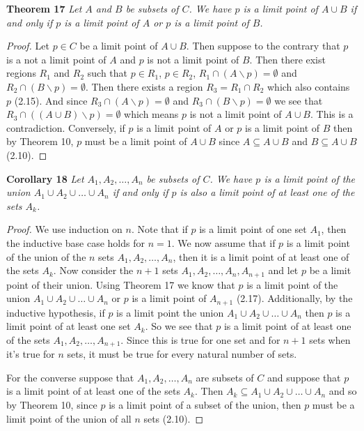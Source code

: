 \documentclass{article}
\begin{document}
\begin{flushleft}
\textbf{Theorem 17}
\textsl{Let $A$ and $B$ be subsets of $C$. We have $p$ is a limit point of $A \cup B$ if and only if $p$ is a limit point of $A$ or $p$ is a limit point of $B$.}
\begin{proof}
Let $p \in C$ be a limit point of $A \cup B$. Then suppose to the contrary that $p$ is a not a limit point of $A$ and $p$ is not a limit point of $B$. Then there exist regions $R_1$ and $R_2$ such that $p \in R_1$, $p \in R_2$, $R_1 \cap (A \backslash p) = \emptyset$ and $R_2 \cap (B \backslash p) = \emptyset$. Then there exists a region $R_3 = R_1 \cap R_2$ which also contains $p$ (2.15). And since $R_3 \cap (A \backslash p) = \emptyset$ and $R_3 \cap (B \backslash p) = \emptyset$ we see that $R_3 \cap ((A \cup B) \backslash p) = \emptyset$ which means $p$ is not a limit point of $A \cup B$. This is a contradiction. Conversely, if $p$ is a limit point of $A$ or $p$ is a limit point of $B$ then by Theorem 10, $p$ must be a limit point of $A \cup B$ since $A \subseteq A \cup B$ and $B \subseteq A \cup B$ (2.10).
\end{proof}

\textbf{Corollary 18}
\textsl{Let $A_1,A_2, \dots ,A_n$ be subsets of $C$. We have $p$ is a limit point of the union $A_1 \cup A_2 \cup \dots \cup A_n$ if and only if $p$ is also a limit point of at least one of the sets $A_k$.}
\begin{proof}
We use induction on $n$. Note that if $p$ is a limit point of one set $A_1$, then the inductive base case holds for $n=1$. We now assume that if $p$ is a limit point of the union of the $n$ sets $A_1,A_2, \dots ,A_n$, then it is a limit point of at least one of the sets $A_k$. Now consider the $n+1$ sets $A_1,A_2, \dots ,A_n, A_{n+1}$ and let $p$ be a limit point of their union. Using Theorem 17 we know that $p$ is a limit point of the union $A_1 \cup A_2 \cup \dots \cup A_n$ or $p$ is a limit point of $A_{n+1}$ (2.17). Additionally, by the inductive hypothesis, if $p$ is a limit point the union $A_1 \cup A_2 \cup \dots \cup A_n$ then $p$ is a limit point of at least one set $A_k$. So we see that $p$ is a limit point of at least one of the sets $A_1, A_2, \dots ,A_{n+1}$. Since this is true for one set and for $n+1$ sets when it's true for $n$ sets, it must be true for every natural number of sets.\newline

For the converse suppose that $A_1,A_2, \dots ,A_n$ are subsets of $C$ and suppose that $p$ is a limit point of at least one of the sets $A_k$. Then $A_k \subseteq A_1 \cup A_2 \cup \dots \cup A_n$ and so by Theorem 10, since $p$ is a limit point of a subset of the union, then $p$ must be a limit point of the union of all $n$ sets (2.10).
\end{proof}


\end{flushleft}
\end{document}
